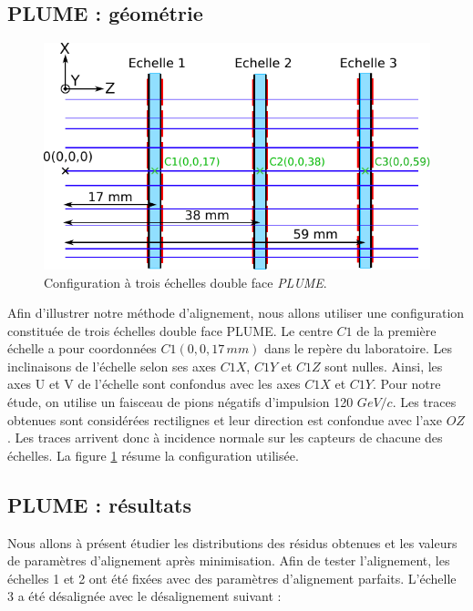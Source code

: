   
   \subsection{PLUME : g\'eom\'etrie}

  \begin{figure}[!htb]
     \begin{center}
       \includegraphics[scale=0.85]{./figures/config_3PLUMEs.pdf}
       \caption{Configuration \`a trois \'echelles double face \textit{PLUME}.}
       \label{fig:Config_3PLUMEs}
     \end{center}
  \end{figure}

   Afin d'illustrer notre m\'ethode d'alignement, nous allons utiliser une configuration constitu\'ee de trois \'echelles double face PLUME. Le centre $C1$ de la premi\`ere \'echelle a pour coordonn\'ees $C1(0,0,17 \, mm)$ dans le rep\`ere du laboratoire. Les inclinaisons de l'\'echelle selon ses axes $C1X$, $C1Y$ et $C1Z$ sont nulles. Ainsi, les axes U et V de l'\'echelle sont confondus avec les axes $C1X$ et $C1Y$. Pour notre \'etude, on utilise un faisceau de pions n\'egatifs d'impulsion 120 $GeV/c$. Les traces obtenues sont consid\'er\'ees rectilignes et leur direction est confondue avec l'axe $OZ$. Les traces arrivent donc \`a incidence normale sur les capteurs de chacune des \'echelles. La figure \ref{fig:Config_3PLUMEs} r\'esume la configuration utilis\'ee.
   
   \subsection{PLUME : r\'esultats}

   Nous allons \`a pr\'esent \'etudier les distributions des r\'esidus obtenues et les valeurs de param\`etres d'alignement apr\`es minimisation. Afin de tester l'alignement, les \'echelles 1 et 2 ont \'et\'e fix\'ees avec des param\`etres d'alignement parfaits. L'\'echelle 3 a \'et\'e d\'esalign\'ee avec le d\'esalignement suivant :
    
